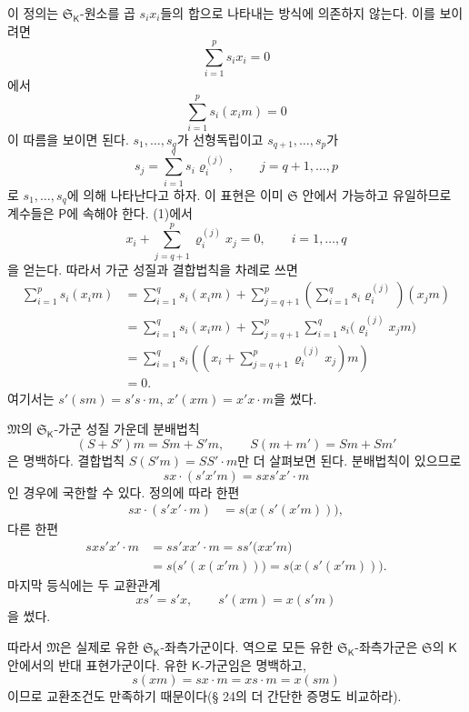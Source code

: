 이 정의는 \(\mathfrak S_{\mathsf K}\)-원소를 곱 \(s_ix_i\)들의 합으로 나타내는 방식에 의존하지 않는다. 이를 보이려면
\[
        \sum_{i=1}^{p}s_ix_i=0                                      \tag{1}
\]
에서
\[
        \sum_{i=1}^{p}s_i(x_i m)=0
\]
이 따름을 보이면 된다. \(s_1,\ldots,s_q\)가 선형독립이고 \(s_{q+1},\ldots,s_p\)가
\[
        s_j=\sum_{i=1}^{q}s_i\varrho_i^{(j)},
        \qquad j=q+1,\ldots,p
\]
로 \(s_1,\ldots,s_q\)에 의해 나타난다고 하자. 이 표현은 이미 \(\mathfrak S\) 안에서 가능하고 유일하므로 계수들은 \(\mathsf P\)에 속해야 한다. (1)에서
\[
        x_i+\sum_{j=q+1}^{p}
        \varrho_i^{(j)}x_j=0,
        \qquad i=1,\ldots,q
\]
을 얻는다. 따라서 가군 성질과 결합법칙을 차례로 쓰면
\[
\begin{aligned}
\sum_{i=1}^{p}s_i(x_i m)
&=\sum_{i=1}^{q}s_i(x_i m)
  +\sum_{j=q+1}^{p}
    \left(\sum_{i=1}^{q}s_i\varrho_i^{(j)}\right)(x_jm)\\
&=\sum_{i=1}^{q}s_i(x_i m)
  +\sum_{j=q+1}^{p}\sum_{i=1}^{q}
    s_i\bigl(\varrho_i^{(j)}x_jm\bigr)\\
&=\sum_{i=1}^{q}
  s_i\left(
  \left(x_i+\sum_{j=q+1}^{p}
  \varrho_i^{(j)}x_j\right)m\right)\\
&=0.
\end{aligned}
\]
여기서는 \(s'(sm)=s's\cdot m\), \(x'(xm)=x'x\cdot m\)을 썼다.

\(\mathfrak M\)의 \(\mathfrak S_{\mathsf K}\)-가군 성질 가운데 분배법칙
\[
        (S+S')m=Sm+S'm,
        \qquad
        S(m+m')=Sm+Sm'
\]
은 명백하다. 결합법칙 \(S(S'm)=SS'\cdot m\)만 더 살펴보면 된다. 분배법칙이 있으므로
\[
        sx\cdot(s'x'm)=sxs'x'\cdot m
\]
인 경우에 국한할 수 있다. 정의에 따라 한편
\[
\begin{aligned}
sx\cdot(s'x'\cdot m)
&=s\bigl(x(s'(x'm))\bigr),
\end{aligned}
\]
다른 한편
\[
\begin{aligned}
sxs'x'\cdot m
&=ss'xx'\cdot m
 =ss'\bigl(xx'm\bigr)\\
&=s\bigl(s'(x(x'm))\bigr)
 =s\bigl(x(s'(x'm))\bigr).
\end{aligned}
\]
마지막 등식에는 두 교환관계
\[
        xs'=s'x,
        \qquad
        s'(xm)=x(s'm)
\]
을 썼다.

따라서 \(\mathfrak M\)은 실제로 유한 \(\mathfrak S_{\mathsf K}\)-좌측가군이다. 역으로 모든 유한 \(\mathfrak S_{\mathsf K}\)-좌측가군은 \(\mathfrak S\)의 \(\mathsf K\) 안에서의 반대 표현가군이다. 유한 \(\mathsf K\)-가군임은 명백하고,
\[
        s(xm)=sx\cdot m=xs\cdot m=x(sm)
\]
이므로 교환조건도 만족하기 때문이다(§ 24의 더 간단한 증명도 비교하라).

